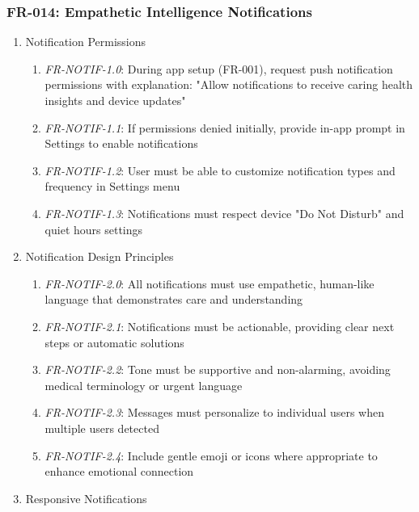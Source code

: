 \documentclass[conference]{IEEEtran}
\begin{document}
            \subsubsection{FR-014: Empathetic Intelligence Notifications}
                \begin{enumerate}
                    \item Notification Permissions
                        \begin{enumerate}
                            \item \textit{FR-NOTIF-1.0}: During app setup (FR-001), request push notification permissions with explanation: "Allow notifications to receive caring health insights and device updates"
                            \item \textit{FR-NOTIF-1.1}: If permissions denied initially, provide in-app prompt in Settings to enable notifications
                            \item \textit{FR-NOTIF-1.2}: User must be able to customize notification types and frequency in Settings menu
                            \item \textit{FR-NOTIF-1.3}: Notifications must respect device "Do Not Disturb" and quiet hours settings
                        \end{enumerate}
                    \item Notification Design Principles
                        \begin{enumerate}
                            \item \textit{FR-NOTIF-2.0}: All notifications must use empathetic, human-like language that demonstrates care and understanding
                            \item \textit{FR-NOTIF-2.1}: Notifications must be actionable, providing clear next steps or automatic solutions
                            \item \textit{FR-NOTIF-2.2}: Tone must be supportive and non-alarming, avoiding medical terminology or urgent language
                            \item \textit{FR-NOTIF-2.3}: Messages must personalize to individual users when multiple users detected
                            \item \textit{FR-NOTIF-2.4}: Include gentle emoji or icons where appropriate to enhance emotional connection
                        \end{enumerate}
                    \item Responsive Notifications

\end{enumerate}
\end{document}
